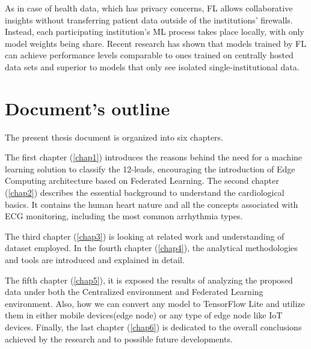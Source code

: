 As in case of health data, which has privacy concerns, FL allows collaborative insights without transferring patient data outside of the institutions’ firewalls. Instead, each participating institution’s ML process takes place locally, with only model weights being share. Recent research has shown that models trained by FL can achieve performance levels comparable to ones trained on centrally hosted data sets and superior to models that only see isolated single-institutional data. \cite{Rieke_2020}





\section{Document's outline} \label{doc_struct}

The present thesis document is organized into six chapters. 

The first chapter (\ref{chap1}) introduces the reasons behind the need for a machine learning solution to classify the 12-leads, encouraging the introduction of Edge Computing architecture based on Federated Learning. The second chapter (\ref{chap2}) describes the essential background to understand the cardiological basics. It contains the human heart nature and all the concepts associated with ECG monitoring, including the most common arrhythmia types.

The third chapter (\ref{chap3}) is looking at related work and understanding of dataset employed. In the fourth chapter (\ref{chap4}), the analytical methodologies and tools are introduced and explained in detail. 

The fifth chapter (\ref{chap5}), it is exposed the results of analyzing the proposed data under both the Centralized environment and Federated Learning environment. Also, how we can convert any model to TensorFlow Lite and utilize them in either mobile devices(edge node) or any type of edge node like IoT devices.  Finally, the last chapter (\ref{chap6}) is dedicated to the overall conclusions achieved by the research and to possible future developments.